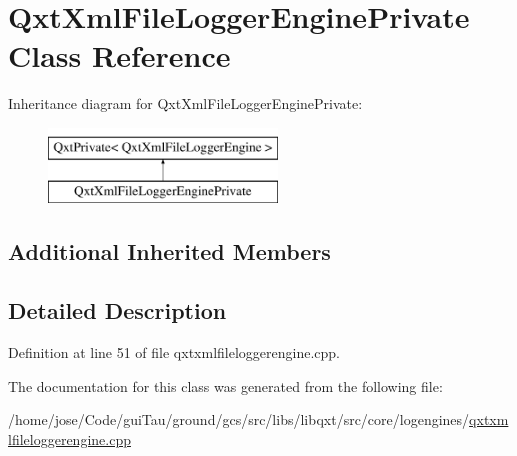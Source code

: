 \hypertarget{class_qxt_xml_file_logger_engine_private}{\section{Qxt\-Xml\-File\-Logger\-Engine\-Private Class Reference}
\label{class_qxt_xml_file_logger_engine_private}
}
Inheritance diagram for Qxt\-Xml\-File\-Logger\-Engine\-Private\-:\begin{figure}[H]
\begin{center}
\leavevmode
\includegraphics[height=2.000000cm]{class_qxt_xml_file_logger_engine_private}
\end{center}
\end{figure}
\subsection*{Additional Inherited Members}


\subsection{Detailed Description}


Definition at line 51 of file qxtxmlfileloggerengine.\-cpp.



The documentation for this class was generated from the following file\-:\begin{DoxyCompactItemize}
\item 
/home/jose/\-Code/gui\-Tau/ground/gcs/src/libs/libqxt/src/core/logengines/\hyperlink{qxtxmlfileloggerengine_8cpp}{qxtxmlfileloggerengine.\-cpp}\end{DoxyCompactItemize}
